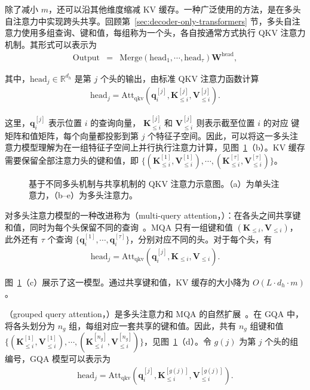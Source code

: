 除了减小 $m$，还可以沿其他维度缩减 KV 缓存。一种广泛使用的方法，是在多头自注意力中实现跨头共享。回顾第~\ref{sec:decoder-only-transformers} 节，多头自注意力使用多组查询、键和值，每组称为一个头，各自按通常方式执行 QKV 注意力机制。其形式可以表示为
\begin{eqnarray}
\mathrm{Output} & = & \mathrm{Merge}(\mathrm{head}_1,\cdots,\mathrm{head}_{\tau}) \mathbf{W}^{\mathrm{head}},
\end{eqnarray}

\noindent 其中，$\mathrm{head}_j \in \mathbb{R}^{d_h}$ 是第 $j$ 个头的输出，由标准 QKV 注意力函数计算
\begin{eqnarray}
\mathrm{head}_j = \mathrm{Att}_{\mathrm{qkv}}(\mathbf{q}_{i}^{[j]},\mathbf{K}_{\le i}^{[j]},\mathbf{V}_{\le i}^{[j]}).
\end{eqnarray}

这里，$\mathbf{q}_{i}^{[j]}$ 表示位置 $i$ 的查询向量，
$\mathbf{K}_{\le i}^{[j]}$ 和 $\mathbf{V}_{\le i}^{[j]}$ 则表示截至位置 $i$ 的对应
键矩阵和值矩阵，每个向量都投影到第 $j$ 个特征子空间。因此，可以将这一多头注意力模型理解为在一组特征子空间上并行执行注意力计算，见图~\ref{fig:comparison-of-multihead-attention-models}（b）。KV 缓存需要保留全部注意力头的键和值，即 $\{(\mathbf{K}_{\le i}^{[1]},\mathbf{V}_{\le i}^{[1]}),\cdots,(\mathbf{K}_{\le i}^{[\tau]},\mathbf{V}_{\le i}^{[\tau]})\}$。

\begin{figure}[!t]
\centering

\caption{基于不同多头机制与共享机制的 QKV 注意力示意图。（a）为单头注意力，（b--e）为多头注意力。}
\label{fig:comparison-of-multihead-attention-models}
\end{figure}

对多头注意力模型的一种改进称为（multi-query attention，）：在各头之间共享键和值，同时为每个头保留不同的查询~\cite{shazeer:2019fast}。MQA 只有一组键和值 $(\mathbf{K}_{\le i}, \mathbf{V}_{\le i})$，此外还有 $\tau$ 个查询 $\{\mathbf{q}_{i}^{[1]},\cdots,\mathbf{q}_{i}^{[\tau]}\}$，分别对应不同的头。对于每个头，有
\begin{eqnarray}
\mathrm{head}_j = \mathrm{Att}_{\mathrm{qkv}}(\mathbf{q}_{i}^{[j]},\mathbf{K}_{\le i},\mathbf{V}_{\le i}).
\end{eqnarray}

\noindent 图~\ref{fig:comparison-of-multihead-attention-models}（c）展示了这一模型。通过共享键和值，KV 缓存的大小降为 $O(L \cdot d_h \cdot m)$。

（grouped query attention，）是多头注意力和 MQA 的自然扩展~\cite{ainslie-etal:2023gqa}。在 GQA 中，将各头划分为 $n_g$ 组，每组对应一套共享的键和值。因此，共有 $n_g$ 组键和值 $\{(\mathbf{K}_{\le i}^{[1]},\mathbf{V}_{\le i}^{[1]}),\cdots,(\mathbf{K}_{\le i}^{[n_g]},\mathbf{V}_{\le i}^{[n_g]})\}$，见图~\ref{fig:comparison-of-multihead-attention-models}（d）。令 $g(j)$ 为第 $j$ 个头的组编号，GQA 模型可以表示为
\begin{eqnarray}
\mathrm{head}_j = \mathrm{Att}_{\mathrm{qkv}}(\mathbf{q}_{i}^{[j]},\mathbf{K}_{\le i}^{[g(j)]},\mathbf{V}_{\le i}^{[g(j)]}).
\end{eqnarray}

